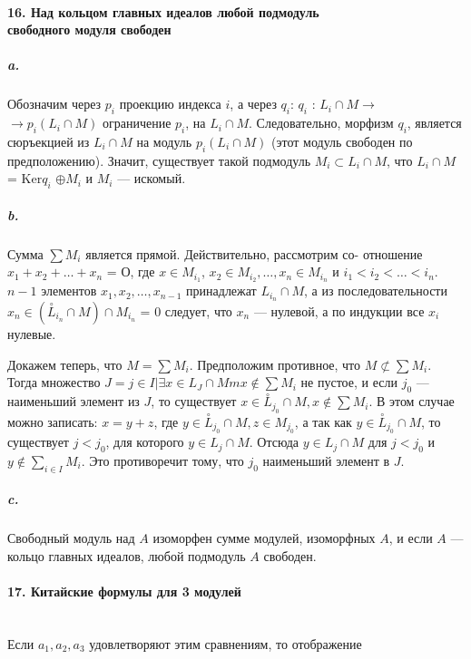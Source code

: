\documentclass{mai_book}
\begin{document}
{\paragraph{16. Над кольцом главных идеалов любой подмодуль\\
свободного модуля свободен}

\subparagraph{a.} Обозначим через $p_{i}$ проекцию индекса $i$, а через $q_{i}$: $q_{i}$ : $L_{i} \cap M \rightarrow$
$\rightarrow p_{i}(L_{i} \cap M)$ ограничение $p_i$, на $L_{i} \cap M$. Следовательно, морфизм $q_{i}$, является сюръекцией из $L_{i} \cap M$ на модуль $p_{i}(L_{i} \cap M)$ (этот модуль свободен
по предположению). Значит, существует такой подмодуль $M_{i} \subset L_{i} \cap M$,
что $L_{i} \cap M$ = Ker{$q_{i}$} $\oplus M_{i}$ и $M_{i}$ — искомый.

\subparagraph{b.} Сумма $\sum M_{i}$ является прямой. Действительно, рассмотрим со-
отношение $x_{1} + x_2 +\dots+ x_n$ = О, где $x \in M_{i_1}$, $x_2 \in M_{i_2},\ldots,x_n \in M_{i_n}$ и
$i_1 < i_2 <\ldots< i_n$. $n - 1$ элементов $x_1, x_2,\ldots, x_{n-1}$ принадлежат $L_{i_n} \cap M$,
а из последовательности $x_n \in (\overset{\circ}{L}_{i_n} \cap M) \cap M_{i_n}$ = {0} следует, что $x_n$ ---
нулевой, а по индукции все $x_i$ нулевые.

Докажем теперь, что $M = \sum M_i$. Предположим противное, что
$M \not\subset \sum M_i$. Тогда множество $J = {j \in I | \exists x \in L_J \cap Mm x \notin \sum M_i}$
не пустое, и если $j_0$ — наименьший элемент из $J$, то существует
$x \in \overset{\circ}{L}_{j_0} \cap M, x \notin \sum M_i$. В этом случае можно записать: $x = y + z$,
где $y \in \overset{\circ}{L}_{j_0} \cap M, z \in M_{j_0}$, а так как $y \in \overset{\circ}{L}_{j_0} \cap M$, то существует $j < j_0$,
для которого $y \in L_j \cap M$. Отсюда $y \in L_j \cap M$ для $j < j_0$ и $y \notin \sum_{i \in I} M_i$.
Это противоречит тому, что $j_0$ наименьший элемент в $J$.

\subparagraph{c.} Свободный модуль над $A$ изоморфен сумме модулей, изоморфных
$A$, и если $A$ — кольцо главных идеалов, любой подмодуль $A$ свободен.

\paragraph{17. Китайские формулы для 3 модулей} \mbox{}\\

Если $a_1, a_2, a_3$ удовлетворяют этим сравнениям, то отображение

}
\end{document}
